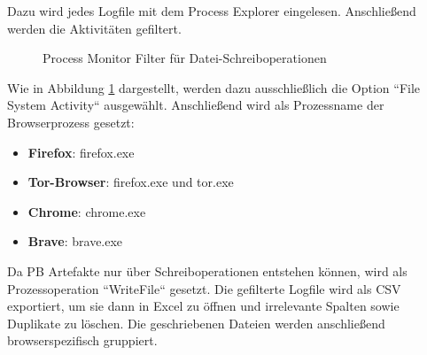 Dazu wird jedes Logfile mit dem Process Explorer eingelesen. Anschließend werden die Aktivitäten gefiltert.
\begin{figure}[h!]
	\centerline{}
	\label{img:procmon-writefile-filter}
	\caption{Process Monitor Filter für Datei-Schreiboperationen}
\end{figure}
Wie in Abbildung \ref{img:procmon-writefile-filter} dargestellt, werden dazu ausschließlich die Option ``File System Activity`` ausgewählt.
Anschließend wird als Prozessname der Browserprozess gesetzt:
\begin{itemize}
\item \textbf{Firefox}: firefox.exe
\item \textbf{Tor-Browser}: firefox.exe und tor.exe
\item \textbf{Chrome}: chrome.exe
\item \textbf{Brave}: brave.exe
\end{itemize}
Da PB Artefakte nur über Schreiboperationen entstehen können, wird als Prozessoperation ``WriteFile`` gesetzt.
Die gefilterte Logfile wird als CSV exportiert, um sie dann in Excel zu öffnen und irrelevante Spalten sowie Duplikate zu löschen.
Die geschriebenen Dateien werden anschließend browserspezifisch gruppiert.

